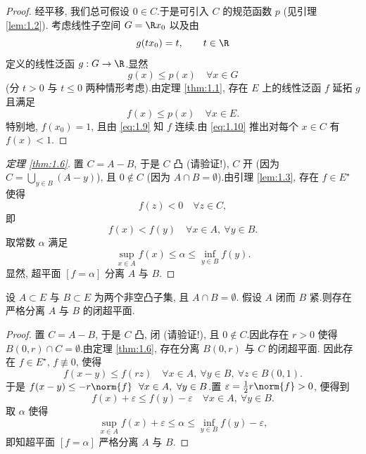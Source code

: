 \begin{proof}
经平移, 我们总可假设 $0\in C$.于是可引入 $C$ 的规范函数 $p$ (见引理  \ref{lem:1.2}).
考虑线性子空间 $G=\R x_0$ 以及由
\begin{equation*}
g(tx_0)=t,\qquad t\in\R
\end{equation*}
定义的线性泛函 $g:G\to\R$.显然
\begin{equation*}
g(x)\le p(x)\quad \forall x\in G
\end{equation*}
(分 $t>0$ 与 $t\le 0$ 两种情形考虑).由定理  \ref{thm:1.1}, 存在 $E$ 上的线性泛函 $f$
延拓 $g$ 且满足
\begin{equation*}
f(x)\le p(x)\quad \forall x\in E.
\end{equation*}
特别地, $f(x_0)=1$, 且由 \eqref{eq:1.9} 知 $f$ 连续.由 \eqref{eq:1.10} 推出对每个 $x\in C$ 有 $f(x)<1$.
\end{proof}

\begin{proof}[定理 \ref{thm:1.6}]
置 $C=A-B$, 于是 $C$ 凸 (请验证!), $C$ 开 (因为 $C=\bigcup_{y\in B}(A-y)$),
且 $0\notin C$ (因为 $A\cap B=\emptyset$).由引理  \ref{lem:1.3}, 存在 $f\in E^\star$
使得
\begin{equation*}
f(z)<0\quad \forall z\in C,
\end{equation*}
即
\begin{equation*}
f(x)<f(y)\quad \forall x\in A,\ \forall y\in B.
\end{equation*}
取常数 $\alpha$ 满足
\begin{equation*}
\sup_{x\in A}f(x)\le\alpha\le\inf_{y\in B}f(y).
\end{equation*}
显然, 超平面 $[f=\alpha]$ 分离 $A$ 与 $B$.
\end{proof}

\begin{keytheorem}
\label{thm:1.7}
设 $A\subset E$ 与 $B\subset E$ 为两个非空凸子集, 且 $A\cap B=\emptyset$.
假设 $A$ 闭而 $B$ 紧.则存在严格分离 $A$ 与 $B$ 的闭超平面.
\end{keytheorem}

\begin{proof}
置 $C=A-B$, 于是 $C$ 凸, 闭 (请验证!), 且 $0\notin C$.因此存在 $r>0$ 使得
$B(0,r)\cap C=\emptyset$.由定理  \ref{thm:1.6}, 存在分离 $B(0,r)$ 与 $C$ 的闭超平面.
因此存在 $f\in E^\star$, $f\not\equiv 0$, 使得
\begin{equation*}
f(x-y)\le f(rz)\quad \forall x\in A,\ \forall y\in B,\ \forall z\in B(0,1).
\end{equation*}
于是 $f(x-y)\le-r\norm{f}\ \ \forall x\in A,\ \forall y\in B$.置
$\varepsilon=\tfrac{1}{2}r\norm{f}>0$, 便得到
\begin{equation*}
f(x)+\varepsilon\le f(y)-\varepsilon\quad \forall x\in A,\ \forall y\in B.
\end{equation*}
取 $\alpha$ 使得
\begin{equation*}
\sup_{x\in A}f(x)+\varepsilon\le\alpha\le\inf_{y\in B}f(y)-\varepsilon,
\end{equation*}
即知超平面 $[f=\alpha]$ 严格分离 $A$ 与 $B$.
\end{proof}

